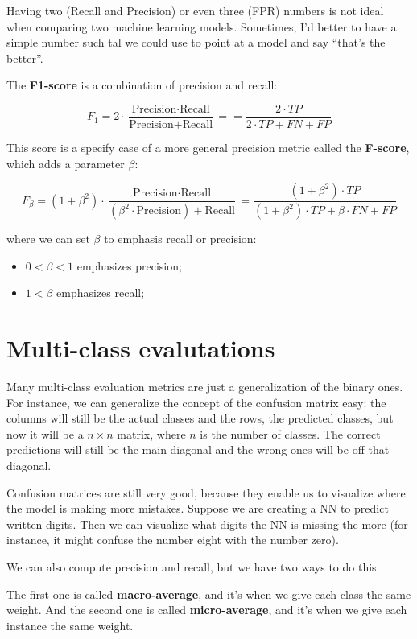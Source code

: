 \documentclass[12pt, a4paper, oneside]{article}
\begin{document}
Having two (Recall and Precision) or even three (FPR) numbers is not ideal when
comparing two machine learning models. Sometimes, I'd better to have a simple
number such tal we could use to point at a model and say ``that's the better''.

The \textbf{F1-score} is a combination of precision and recall:

\[ F_1 = 2\cdot\dfrac{\textrm{Precision}\cdot
        \textrm{Recall}}{\textrm{Precision} + \textrm{Recall}} =
= \dfrac{2\cdot TP}{2\cdot TP+FN+FP} \]

This score is a specify case of a more general precision metric called the
\textbf{F-score}, which adds a parameter $\beta$:

\[ F_\beta = (1+\beta^2)\cdot\dfrac{\textrm{Precision}\cdot\textrm{Recall}}
{(\beta^2\cdot\textrm{Precision}) + \textrm{Recall}} =
\dfrac{(1+\beta^2)\cdot TP}{(1+\beta^2)\cdot TP + \beta\cdot FN + FP} \]

where we can set $\beta$ to emphasis recall or precision:
\begin{itemize}
  \item $0<\beta<1$ emphasizes precision;
  \item $1<\beta$ emphasizes recall;
\end{itemize}

\section{Multi-class evalutations}

Many multi-class evaluation metrics are just a generalization of the binary
ones. For instance, we can generalize the concept of the confusion matrix easy:
the columns will still be the actual classes and the rows, the predicted
classes, but now it will be a $n\times n$ matrix, where $n$ is the number of
classes. The correct predictions will still be the main diagonal and the
wrong ones will be off that diagonal.

Confusion matrices are still very good, because they enable us to visualize
where the model is making more mistakes. Suppose we are creating a NN to predict
written digits. Then we can visualize what digits the NN is missing the more
(for instance, it might confuse the number eight with the number zero).

We can also compute precision and recall, but we have two ways to do this.

The first one is called \textbf{macro-average}, and it's when we give each class
the same weight. And the second one is called \textbf{micro-average}, and it's
when we give each instance the same weight.
\end{document}
